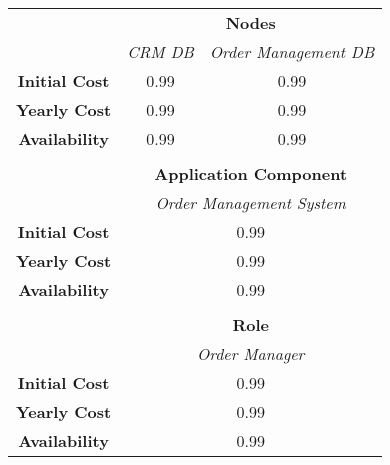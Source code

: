 \begin{table}[H]
	\centering
	\begin{tabular}{|c|c|p{2cm}|p{2.5cm}|p{2.5cm}|p{2.5cm}|}
		\cline{3-6}

		\multicolumn{2}{c}{} & \multicolumn{4}{|c|}{\textbf{Nodes}} \\ \cline{3-6}
		\multicolumn{2}{c|}{} & \multicolumn{2}{c|}{\textsl{CRM DB}} & \multicolumn{2}{c|}{\textsl{Order Management DB}} \\
		\hline
		\multicolumn{2}{|c|}{\textbf{Initial Cost}} & \multicolumn{2}{c|}{0.99} & \multicolumn{2}{c|}{0.99} \\ \hline
		\multicolumn{2}{|c|}{\textbf{Yearly Cost}}  & \multicolumn{2}{c|}{0.99} & \multicolumn{2}{c|}{0.99} \\ \hline
		\multicolumn{2}{|c|}{\textbf{Availability}}  & \multicolumn{2}{c|}{0.99} & \multicolumn{2}{c|}{0.99} \\ \hline
		
		\multicolumn{6}{c}{} \\ \cline{3-6}
		\multicolumn{2}{c}{} & \multicolumn{4}{|c|}{\textbf{Application Component}} \\ \cline{3-6}
		\multicolumn{2}{c|}{} & \multicolumn{4}{c|}{\textsl{Order Management System}} \\
		\hline
		\multicolumn{2}{|c|}{\textbf{Initial Cost}} & \multicolumn{4}{c|}{0.99}  \\ \hline
		\multicolumn{2}{|c|}{\textbf{Yearly Cost}}  & \multicolumn{4}{c|}{0.99}  \\ \hline
		\multicolumn{2}{|c|}{\textbf{Availability}}  & \multicolumn{4}{c|}{0.99}  \\ \hline
		
		\multicolumn{6}{c}{} \\ \cline{3-6}
		\multicolumn{2}{c}{} & \multicolumn{4}{|c|}{\textbf{Role}} \\ \cline{3-6}
		\multicolumn{2}{c|}{} & \multicolumn{4}{c|}{\textsl{Order Manager}} \\
		\hline
		\multicolumn{2}{|c|}{\textbf{Initial Cost}} & \multicolumn{4}{c|}{0.99}  \\ \hline
		\multicolumn{2}{|c|}{\textbf{Yearly Cost}}  & \multicolumn{4}{c|}{0.99}  \\ \hline
		\multicolumn{2}{|c|}{\textbf{Availability}}  & \multicolumn{4}{c|}{0.99}  \\ \hline


\end{tabular}
\end{table}
